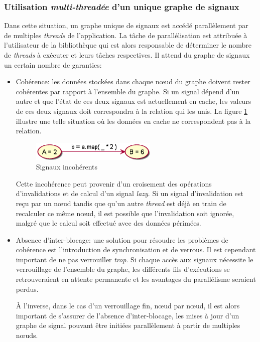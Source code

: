 \subsubsection{Utilisation \emph{multi-threadée} d'un unique graphe de signaux}

Dans cette situation, un graphe unique de signaux est accédé parallèlement par de multiples \emph{threads} de l'application. La tâche de parallélisation est attribuée à l'utilisateur de la bibliothèque qui est alors responsable de déterminer le nombre de \emph{threads} à exécuter et leurs tâches respectives. Il attend du graphe de signaux un certain nombre de garanties:
\begin{itemize}
	\item Cohérence: les données stockées dans chaque nœud du graphe doivent rester cohérentes par rapport à l'ensemble du graphe. Si un signal dépend d'un autre et que l'état de ces deux signaux est actuellement en cache, les valeurs de ces deux signaux doit correspondra à la relation qui les unis. La figure \ref{fig:sig-inconsistency} illustre une telle situation où les données en cache ne correspondent pas à la relation.
	
	\begin{figure}
		\centering
		\includegraphics[width=6cm]{img/signals_coherence.eps}
		\caption{Signaux incohérents}
		\label{fig:sig-inconsistency}
	\end{figure}

	Cette incohérence peut provenir d'un croisement des opérations d'invalidations et de calcul d'un signal \emph{lazy}. Si un signal d'invalidation est reçu par un nœud tandis que qu'un autre \emph{thread} est déjà en train de recalculer ce même nœud, il est possible que l'invalidation soit ignorée, malgré que le calcul soit effectué avec des données périmées.
	
	\item Absence d'inter-blocage: une solution pour résoudre les problèmes de cohérence est l'introduction de synchronisation et de verrous. Il est cependant important de ne pas verrouiller \emph{trop}. Si chaque accès aux signaux nécessite le verrouillage de l'ensemble du graphe, les différents fils d'exécutions se retrouveraient en attente permanente et les avantages du parallélisme seraient perdus.
	
	À l'inverse, dans le cas d'un verrouillage fin, nœud par nœud, il est alors important de s'assurer de l'absence d'inter-blocage, les mises à jour d'un graphe de signal pouvant être initiées parallèlement à partir de multiples nœuds.
	

\end{itemize}
